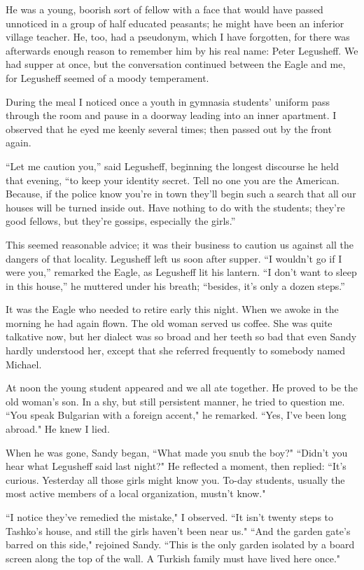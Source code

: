 \documentclass[a5paper,12pt]{book}
\begin{document}
He was a young, boorish sort of fellow with a face that would have passed unnoticed in a group of half educated peasants; he might have been an inferior village teacher. He, too, had a pseudonym, which I have forgotten, for there was afterwards enough reason to remember him by his real name: Peter Legusheff. We had supper at once, but the conversation continued between the Eagle and me, for Legusheff seemed of a moody temperament. 

During the meal I noticed once a youth in gymnasia students' uniform pass through the room and pause in a doorway leading into an inner apartment. I observed that he eyed me keenly several times; then passed out by the front again.

“Let me caution you,” said Legusheff, beginning the longest discourse he held that evening, “to keep your identity secret. Tell no one you are the American. Because, if the police know you’re in town they’ll begin such a search that all our houses will be turned inside out. Have nothing to do with the students; they’re good fellows, but they’re gossips, especially the girls.”

This seemed reasonable advice; it was their business to caution us against all the dangers of that locality. Legusheff left us soon after supper. “I wouldn’t go if I were you,” remarked the Eagle, as Legusheff lit his lantern. “I don’t want to sleep in this house,” he muttered under his breath; “besides, it’s only a dozen steps.”

It was the Eagle who needed to retire early this night. When we awoke in the morning he had again flown. The old woman served us coffee. She was quite talkative now, but her dialect was so broad and her teeth so bad that even Sandy hardly understood her, except that she referred frequently to somebody named Michael.

At noon the young student appeared and we all ate together. He proved to be the old woman's son. In a shy, but still persistent manner, he tried to question me. “You speak Bulgarian with a foreign accent," he remarked. “Yes, I’ve been long abroad." He knew I lied.

When he was gone, Sandy began, “What made you snub the boy?" “Didn’t you hear what Legusheff said last night?" He reflected a moment, then replied: “It’s curious. Yesterday all those girls might know you. To-day students, usually the most active members of a local organization, mustn't know."

“I notice they've remedied the mistake," I observed. “It isn't twenty steps to Tashko’s house, and still the girls haven't been near us." “And the garden gate’s barred on this side," rejoined Sandy. “This is the only garden isolated by a board screen along the top of the wall. A Turkish family must have lived here once."
\end{document}
